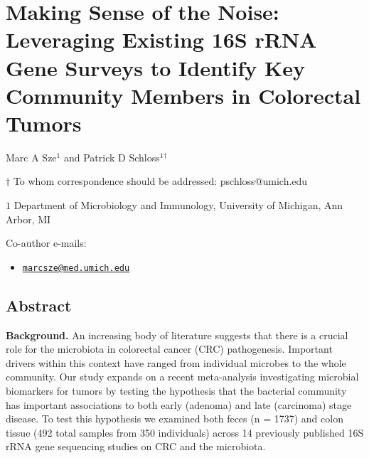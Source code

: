 \documentclass[12pt,]{article}
\title{}
\author{}
\date{}
\providecommand{\tightlist}{%
  \setlength{\itemsep}{0pt}\setlength{\parskip}{0pt}}
\begin{document}
\section{Making Sense of the Noise: Leveraging Existing 16S rRNA Gene
Surveys to Identify Key Community Members in Colorectal
Tumors}\label{making-sense-of-the-noise-leveraging-existing-16s-rrna-gene-surveys-to-identify-key-community-members-in-colorectal-tumors}

\begin{center}
\vspace{25mm}

Marc A Sze${^1}$ and Patrick D Schloss${^1}$${^\dagger}$

\vspace{20mm}

$\dagger$ To whom correspondence should be addressed: pschloss@umich.edu

$1$ Department of Microbiology and Immunology, University of Michigan, Ann Arbor, MI




\end{center}

Co-author e-mails:

\begin{itemize}
\tightlist
\item
  \href{mailto:marcsze@med.umich.edu}{\nolinkurl{marcsze@med.umich.edu}}
\end{itemize}

\newpage

\linenumbers

\subsection{Abstract}\label{abstract}

\textbf{Background.} An increasing body of literature suggests that
there is a crucial role for the microbiota in colorectal cancer (CRC)
pathogenesis. Important drivers within this context have ranged from
individual microbes to the whole community. Our study expands on a
recent meta-analysis investigating microbial biomarkers for tumors by
testing the hypothesis that the bacterial community has important
associations to both early (adenoma) and late (carcinoma) stage disease.
To test this hypothesis we examined both feces (n = 1737) and colon
tissue (492 total samples from 350 individuals) across 14 previously
published 16S rRNA gene sequencing studies on CRC and the microbiota.
\end{document}
